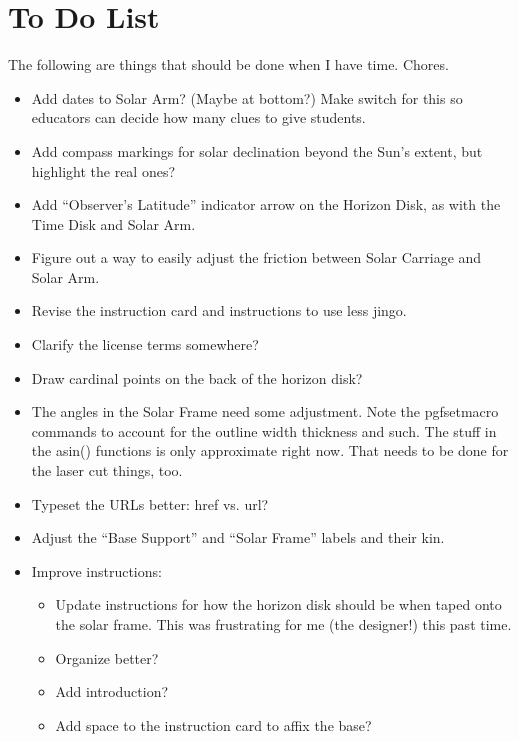 \documentclass[tikz]{article}
\newif\ifPrintInstructions  %
\newif\ifPrintWishlist  %
\begin{document}
\fi %








\ifPrintWishlist
	\newpage
	
	\section*{To Do List}
	The following are things that should be done when I have time. Chores. 
	\begin{itemize}
		\item Add dates to Solar Arm? (Maybe at bottom?) Make switch for this so educators can decide how many clues to give students.
		\item Add compass markings for solar declination beyond the Sun's extent, but highlight the real ones?
		\item Add ``Observer's Latitude'' indicator arrow on the Horizon Disk, as with the Time Disk and Solar Arm. 
		\item Figure out a way to easily adjust the friction between Solar Carriage and Solar Arm. 
		\item Revise the instruction card and instructions to use less jingo. 
		\item Clarify the license terms somewhere?
		\item Draw cardinal points on the back of the horizon disk? 
		\item The angles in the Solar Frame need some adjustment. Note the pgfsetmacro commands to account for the outline width thickness and such. The stuff in the asin() functions is only approximate right now. That needs to be done for the laser cut things, too. 
		\item Typeset the URLs better: href vs. url?
		\item Adjust the ``Base Support'' and ``Solar Frame'' labels and their kin. 
		\item Improve instructions:
		\begin{itemize}
			\item Update instructions for how the horizon disk should be when taped onto the solar frame. This was frustrating for me (the designer!) this past time. 
			\item Organize better? 
			\item Add introduction? 
			\item Add space to the instruction card to affix the base?
		\end{itemize}
	\end{itemize}
\end{document}
